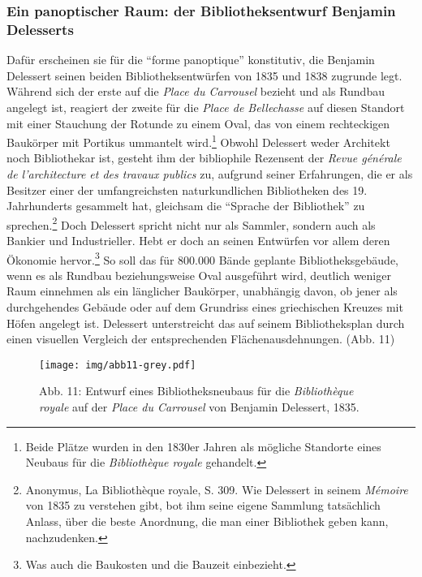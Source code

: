 \subsubsection{Ein panoptischer Raum: der Bibliotheksentwurf Benjamin
Delesserts}\label{ein-panoptischer-raum-der-bibliotheksentwurf-benjamin-delesserts}

Dafür erscheinen sie für die \enquote{forme panoptique} konstitutiv, die
Benjamin Delessert seinen beiden Bibliotheksentwürfen von 1835 und 1838
zugrunde legt. Während sich der erste auf die \emph{Place du Carrousel}
bezieht und als Rundbau angelegt ist, reagiert der zweite für die
\emph{Place de Bellechasse} auf diesen Standort mit einer Stauchung der
Rotunde zu einem Oval, das von einem rechteckigen Baukörper mit Portikus
ummantelt wird.\footnote{Beide Plätze wurden in den 1830er Jahren als
  mögliche Standorte eines Neubaus für die \emph{Bibliothèque royale}
  gehandelt.} Obwohl Delessert weder Architekt noch Bibliothekar ist,
gesteht ihm der bibliophile Rezensent der \emph{Revue générale de
l'architecture et des travaux publics} zu, aufgrund seiner Erfahrungen,
die er als Besitzer einer der umfangreichsten naturkundlichen
Bibliotheken des 19. Jahrhunderts gesammelt hat, gleichsam die
\enquote{Sprache der Bibliothek} zu sprechen.\footnote{Anonymus, La
  Bibliothèque royale, S. 309. Wie Delessert in seinem \emph{Mémoire}
  von 1835 zu verstehen gibt, bot ihm seine eigene Sammlung tatsächlich
  Anlass, über die beste Anordnung, die man einer Bibliothek geben kann,
  nachzudenken.} Doch Delessert spricht nicht nur als Sammler, sondern
auch als Bankier und Industrieller. Hebt er doch an seinen Entwürfen vor
allem deren Ökonomie hervor.\footnote{Was auch die Baukosten und die
  Bauzeit einbezieht.} So soll das für 800.000 Bände geplante
Bibliotheksgebäude, wenn es als Rundbau beziehungsweise Oval ausgeführt
wird, deutlich weniger Raum einnehmen als ein länglicher Baukörper,
unabhängig davon, ob jener als durchgehendes Gebäude oder auf dem
Grundriss eines griechischen Kreuzes mit Höfen angelegt ist. Delessert
unterstreicht das auf seinem Bibliotheksplan durch einen visuellen
Vergleich der entsprechenden Flächenausdehnungen. (Abb. 11)

\begin{figure}[htbp]
\centering
\texttt{[image: img/abb11-grey.pdf]}
\caption*{Abb. 11: Entwurf eines Bibliotheksneubaus für die
\emph{Bibliothèque royale} auf der \emph{Place du Carrousel} von
Benjamin Delessert, 1835.}
\end{figure}

